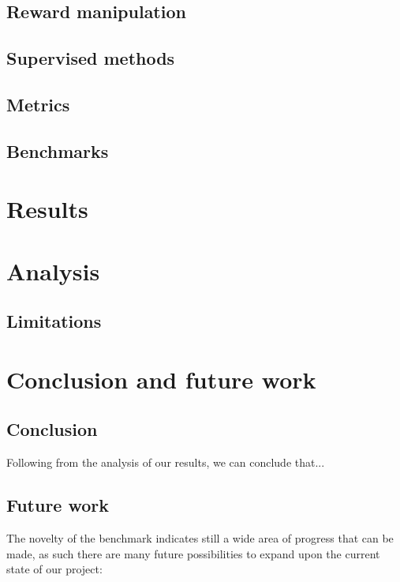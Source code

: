 \documentclass[conference]{IEEEtran}
\begin{document}
\subsection{Reward manipulation}

\subsection{Supervised methods}

\subsection{Metrics}

\subsection{Benchmarks}

\section{Results}

\section{Analysis}

\subsection{Limitations}

\section{Conclusion and future work}
\subsection{Conclusion}
Following from the analysis of our results, we can conclude that...
\subsection{Future work}
The novelty of the benchmark indicates still a wide area of progress that can be made, as such there are many future possibilities to expand upon the current state of our project:
\end{document}
